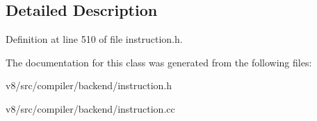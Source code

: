\subsection{Detailed Description}


Definition at line 510 of file instruction.\+h.



The documentation for this class was generated from the following files\+:\begin{DoxyCompactItemize}
\item 
v8/src/compiler/backend/instruction.\+h\item 
v8/src/compiler/backend/instruction.\+cc\end{DoxyCompactItemize}
